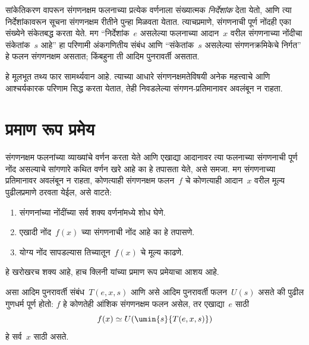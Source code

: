 सांकेतिकरण वापरून संगणनक्षम फलनाच्या प्रत्येक वर्णनाला संख्यात्मक
\emph{निर्देशांक} देता येतो, आणि त्या निर्देशांकावरून सूचना संगणनक्षम
रीतीने पुन्हा मिळवता येतात. त्याचप्रमाणे, संगणनाची पूर्ण नोंदही एका
संख्येने संकेतबद्ध करता येते. मग ``निर्देशांक~$e$ असलेल्या फलनाच्या
आदान~$x$ वरील संगणनाच्या नोंदीचा संकेतांक~$s$ आहे'' हा परिणामी
अंकगणितीय संबंध आणि ``संकेतांक~$s$ असलेल्या संगणनक्रमिकेचे निर्गत''
हे फलन संगणनक्षम असतात; किंबहुना ती आदिम पुनरावर्ती असतात.

हे मूलभूत तथ्य फार सामर्थ्यवान आहे. त्याच्या आधारे संगणनक्षमतेविषयी
अनेक महत्त्वाचे आणि आश्चर्यकारक परिणाम सिद्ध करता येतात, तेही निवडलेल्या
संगणन-प्रतिमानावर अवलंबून न राहता.











\section{प्रमाण रूप प्रमेय}\label{cmp:thy:nfm:sec}

संगणनक्षम फलनांच्या व्याख्यांचे वर्णन करता येते आणि एखाद्या आदानावर
त्या फलनाच्या संगणनाची पूर्ण नोंद असल्याचे सांगणारे कथित वर्णन खरे आहे
का हे तपासता येते, असे समजा. मग संगणनाच्या प्रतिमानावर अवलंबून न राहता,
कोणत्याही संगणनक्षम फलन~$f$ चे कोणत्याही आदान~$x$ वरील मूल्य पुढीलप्रमाणे
ठरवता येईल, असे वाटते:
\begin{enumerate}
  \item संगणनांच्या नोंदींच्या सर्व शक्य वर्णनांमध्ये शोध घेणे.
  \item एखादी नोंद~$f(x)$ च्या संगणनाची नोंद आहे का हे तपासणे.
  \item योग्य नोंद सापडल्यास तिच्यातून~$f(x)$ चे मूल्य काढणे.
\end{enumerate}
हे खरोखरच शक्य आहे, हाच क्लिनी यांच्या प्रमाण रूप प्रमेयाचा आशय आहे.

\begin{thm}[क्लिनीचे प्रमाण रूप प्रमेय]
\label{cmp:thy:nfm:thm:normal-form}
असा आदिम पुनरावर्ती संबंध~$T(e, x, s)$ आणि असे आदिम पुनरावर्ती
फलन~$U(s)$ असते की पुढील गुणधर्म पूर्ण होतो: $f$ हे कोणतेही
आंशिक संगणनक्षम फलन असेल, तर एखाद्या~$e$ साठी
\[f(x) \simeq U(\umin{s}{T(e, x, s)})
\]
हे सर्व~$x$ साठी असते.
\end{thm}

